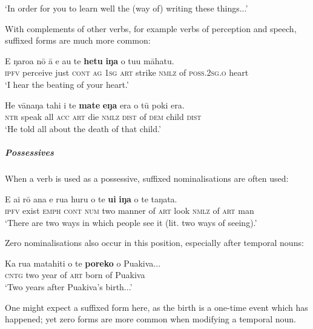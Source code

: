 \glt
‘In order for you to learn well the (way of) writing these things...’ \textstyleExampleref{[R617.003]} 
\z

With complements of other verbs, for example verbs of perception and speech, suffixed forms are much more common:

\ea\label{ex:3.43}
\gll E ŋaro{\ꞌ}a nō {\ꞌ}ā e au te \textbf{hetu} \textbf{iŋa} o tu{\ꞌ}u māhatu.\\
\textsc{ipfv} perceive just \textsc{cont} \textsc{ag} \textsc{1sg} \textsc{art} strike \textsc{nmlz} of \textsc{poss.2sg.o} heart\\

\glt 
‘I hear the beating of your heart.’ \textstyleExampleref{[R505.015]} 
\z

\ea\label{ex:3.44}
\gll He vānaŋa tahi i te \textbf{mate} \textbf{eŋa} era o tū poki era.\\
\textsc{ntr} speak all \textsc{acc} \textsc{art} die \textsc{nmlz} \textsc{dist} of \textsc{dem} child \textsc{dist}\\

\glt 
‘He told all about the death of that child.’ \textstyleExampleref{[R102.105]} 
\z

\subparagraph{Possessives} When a verb is used as a possessive, suffixed nominalisations are often used:

\ea\label{ex:3.45}
\gll E ai rō {\ꞌ}ana e rua huru o te \textbf{u{\ꞌ}i} \textbf{iŋa} o te taŋata. \\
\textsc{ipfv} exist \textsc{emph} \textsc{cont} \textsc{num} two manner of \textsc{art} look \textsc{nmlz} of \textsc{art} man \\

\glt
‘There are two ways in which people see it (lit. two ways of seeing).’ \textstyleExampleref{[R648.218]} 
\z

Zero nominalisations also occur in this position, especially after temporal nouns:

\ea\label{ex:3.46}
\gll Ka rua matahiti o te \textbf{poreko} o Puakiva...\\
\textsc{cntg} two year of \textsc{art} born of Puakiva\\

\glt
‘Two years after Puakiva’s birth...’ \textstyleExampleref{[R229.007]} 
\z

One might expect a suffixed form here, as the birth is a one-time event which has happened; yet zero forms are more common when modifying a temporal noun.

